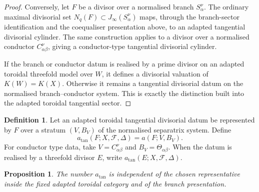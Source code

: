 \documentclass[11pt]{amsart}
\numberwithin{equation}{section}
\theoremstyle{plain}
\newtheorem{Proposition}[Theorem]{Proposition}
\theoremstyle{definition}
\newtheorem{Definition}[Theorem]{Definition}
\newcommand{\cF}{\mathcal F}
\begin{document}
\begin{proof}
Conversely, let \(F\) be a divisor over a normalised branch
\(S_\alpha^\nu\).  The ordinary maximal divisorial set \(N_q(F)\subset
J_\infty(S_\alpha^\nu)\) maps, through the branch-sector identification and
the coequaliser presentation above, to an adapted tangential divisorial
cylinder.  The same construction applies to a divisor over a normalised
conductor \(C_{\alpha\beta}^\nu\), giving a conductor-type tangential
divisorial cylinder.

If the branch or conductor datum is realised by a prime divisor on an adapted
toroidal threefold model over \(W\), it defines a divisorial valuation of
\(K(W)=K(X)\).  Otherwise it remains a tangential divisorial datum on the
normalised branch--conductor system.  This is exactly the distinction built
into the adapted toroidal tangential sector.
\end{proof}

\begin{Definition}
Let an adapted toroidal tangential divisorial datum be represented by $F$ over a stratum $(V,B_V)$ of the normalised separatrix system.  Define
\[
a_{\tan}(F;X,\cF,\Delta)=a(F;V,B_V).
\]
For conductor type data, take $V=C_{\alpha\beta}^\nu$ and $B_V=\Theta_{\alpha\beta}$.  When the datum is realised by a threefold divisor $E$, write $a_{\tan}(E;X,\cF,\Delta)$.
\end{Definition}

\begin{Proposition}
\label{prop:atan-invariance}
The number $a_{\tan}$ is independent of the chosen representative inside the fixed adapted toroidal category and of the branch presentation.
\end{Proposition}
\end{document}
